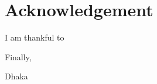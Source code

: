 {}  
\section*{\centering Acknowledgement}

I am thankful to 


Finally,

\vspace*{20.0mm}

\begin{minipage}[t]{0.2\textwidth}
  Dhaka\par
  \thesislongdate
\end{minipage}%
\hfill
\begin{minipage}[t]{0.45\textwidth}
  \CandidateName\par
  \CandidateID
\end{minipage}

\endinput
